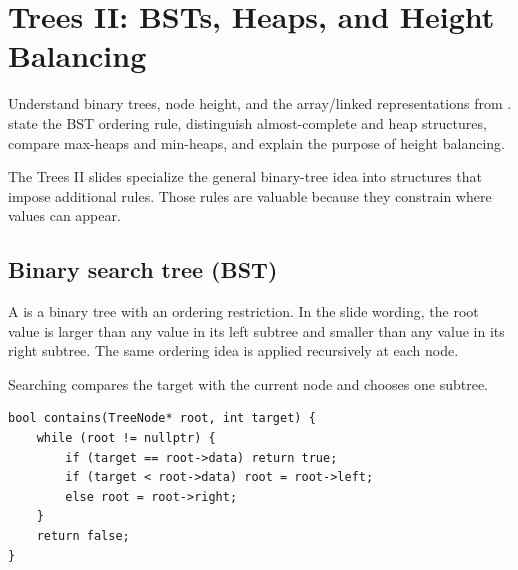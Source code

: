 \chapter{Trees II: BSTs, Heaps, and Height Balancing}\label{ch:trees-ii}

\chapterguide%
  {Understand binary trees, node height, and the array/linked representations from .}
  {state the BST ordering rule, distinguish almost-complete and heap structures, compare max-heaps and min-heaps, and explain the purpose of height balancing.}

The Trees II slides specialize the general binary-tree idea into structures that impose additional rules. Those rules are valuable because they constrain where values can appear.

\section{Binary search tree (BST)}

A  is a binary tree with an ordering restriction. In the slide wording, the root value is larger than any value in its left subtree and smaller than any value in its right subtree. The same ordering idea is applied recursively at each node.

\begin{mlfigure}
\end{mlfigure}

Searching compares the target with the current node and chooses one subtree.

\begin{lstlisting}
bool contains(TreeNode* root, int target) {
    while (root != nullptr) {
        if (target == root->data) return true;
        if (target < root->data) root = root->left;
        else root = root->right;
    }
    return false;
}
\end{lstlisting}

